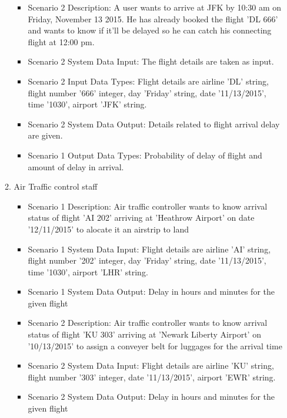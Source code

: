 \begin{itemize}
\begin{enumerate}
\begin{itemize}
    \item{Scenario 2 Description: }
    A user wants to arrive at JFK by 10:30 am on Friday, November 13 2015. He has already booked the flight 'DL 666' and wants to know if it'll be delayed so he can catch his connecting flight at 12:00 pm.
    \item{Scenario 2 System Data Input: }
    The flight details are taken as input.
    \item{Scenario 2 Input Data Types: }
	Flight details are airline 'DL' string, flight number '666' integer, day 'Friday' string, date '11/13/2015', time '1030', airport 'JFK' string.
    \item{Scenario 2 System Data Output: }
    Details related to flight arrival delay are given.
    \item{Scenario 1 Output Data Types: }
    Probability of delay of flight and amount of delay in arrival.
    


	\end{itemize}

\item{Air Traffic control staff}
    \begin{itemize} 
    
   	\item{Scenario 1 Description: }
    Air traffic controller wants to know arrival status of flight 'AI 202' arriving at 'Heathrow Airport' on date '12/11/2015' to alocate it an airstrip to land
	\item{Scenario 1 System Data Input:}
	Flight details are airline 'AI' string, flight number '202' integer, day 'Friday' string, date '11/13/2015', time '1030', airport 'LHR' string.
	\item{Scenario 1 System Data Output: }
    Delay in hours and minutes for the given flight
   	\item{Scenario 2 Description: }
    Air traffic controller wants to know arrival status of flight 'KU 303' arriving at 'Newark Liberty Airport' on '10/13/2015' to assign a conveyer belt for luggages for the arrival time
	\item{Scenario 2 System Data Input: }
    Flight details are airline 'KU' string, flight number '303' integer, date '11/13/2015', airport 'EWR' string.
	\item{Scenario 2 System Data Output: }
    Delay in hours and minutes for the given flight

    \end{itemize}


\end{enumerate}
\end{itemize}
